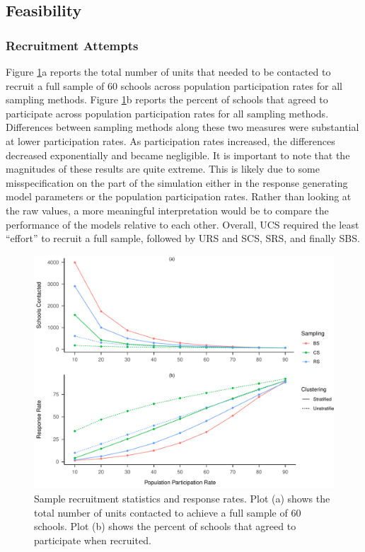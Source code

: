 \documentclass[
  english,
  man,floatsintext]{apa6}
\begin{document}
\hypertarget{feasibility-1}{%
\subsection{Feasibility}\label{feasibility-1}}

\hypertarget{recruitment-attempts}{%
\subsubsection{Recruitment Attempts}\label{recruitment-attempts}}

Figure \ref{fig:fig-responses}a reports the total number of units that needed to be contacted to recruit a full sample of 60 schools across population participation rates for all sampling methods. Figure \ref{fig:fig-responses}b reports the percent of schools that agreed to participate across population participation rates for all sampling methods. Differences between sampling methods along these two measures were substantial at lower participation rates. As participation rates increased, the differences decreased exponentially and became negligible. It is important to note that the magnitudes of these results are quite extreme. This is likely due to some misspecification on the part of the simulation either in the response generating model parameters or the population participation rates. Rather than looking at the raw values, a more meaningful interpretation would be to compare the performance of the models relative to each other. Overall, UCS required the least \enquote{effort} to recruit a full sample, followed by URS and SCS, SRS, and finally SBS.

\begin{figure}
\centering
\includegraphics{GenSamp-Paper_files/figure-latex/fig-responses-1.pdf}
\caption{\label{fig:fig-responses}Sample recruitment statistics and response rates. Plot (a) shows the total number of units contacted to achieve a full sample of 60 schools. Plot (b) shows the percent of schools that agreed to participate when recruited.}
\end{figure}
\end{document}
